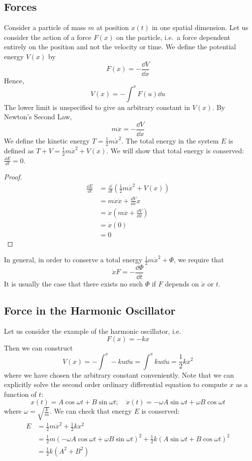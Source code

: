 \subsection{Forces}
Consider a particle of mass \(m\) at position \(x(t)\) in one spatial dimension.
Let us consider the action of a force \(F(x)\) on the particle, i.e.\ a force dependent entirely on the position and not the velocity or time.
We define the potential energy \(V(x)\) by
\[
	F(x) = -\frac{\dd{V}}{\dd{x}}
\]
Hence,
\[
	V(x) = - \int^x F(u) \dd{u}
\]
The lower limit is unspecified to give an arbitrary constant in \(V(x)\).
By Newton's Second Law,
\[
	m\ddot{x} = -\frac{\dd{V}}{\dd{x}}
\]
We define the kinetic energy \(T = \frac{1}{2}m\dot x^2\).
The total energy in the system \(E\) is defined as \(T + V = \frac{1}{2} m \dot x^2 + V(x)\).
We will show that total energy is conserved: \(\frac{\dd{E}}{\dd{t}} = 0\).
\begin{proof}
	\begin{align*}
		\frac{\dd{E}}{\dd{t}} & = \frac{\dd}{\dd{t}}\left( \frac{1}{2}m\dot x^2 + V(x) \right) \\
		                      & = m\dot x \ddot x + \frac{\dd{V}}{\dd{x}} \dot x               \\
		                      & = \dot x\left( m \ddot x + \frac{\dd{V}}{\dd{x}} \right)       \\
		                      & = \dot x ( 0 )                                                 \\
		                      & = 0
	\end{align*}
\end{proof}
\noindent In general, in order to conserve a total energy \(\frac{1}{2}m\dot x^2 + \Phi\), we require that
\[
	\dot x F = -\frac{\dd \Phi}{\dd{t}}
\]
It is usually the case that there exists no such \(\Phi\) if \(F\) depends on \(\dot x\) or \(t\).

\subsection{Force in the Harmonic Oscillator}
Let us consider the example of the harmonic oscillator, i.e.
\[
	F(x) = -kx
\]
Then we can construct
\[
	V(x) = -\int^x -ku \dd{u} = \int^x ku \dd{u} = \frac{1}{2} kx^2
\]
where we have chosen the arbitrary constant conveniently.
Note that we can explicitly solve the second order ordinary differential equation to compute \(x\) as a function of \(t\):
\[
	x(t) = A\cos \omega t + B\sin \omega t;\quad \dot x(t) = -\omega A \sin \omega t + \omega B \cos \omega t
\]
where \(\omega = \sqrt{\frac{k}{m}}\).
We can check that energy \(E\) is conserved:
\begin{align*}
	E & = \frac{1}{2}m\dot x^2 + \frac{1}{2}kx^2                                                                                                         \\
	  & = \frac{1}{2}m \left( -\omega A \cos \omega t + \omega B \sin \omega t \right)^2 + \frac{1}{2}k \left( A\sin \omega t + B\cos \omega t \right)^2 \\
	  & = \frac{1}{2}k(A^2 + B^2)
\end{align*}

